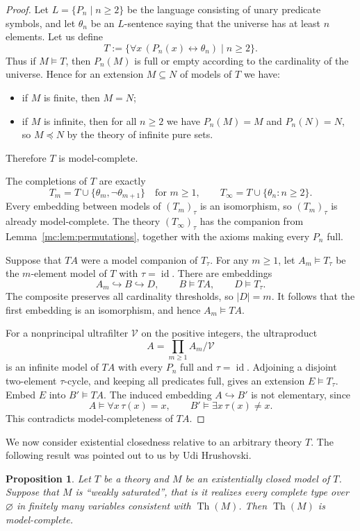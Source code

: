\documentclass[10pt,a4paper]{amsart}
\renewcommand{\geq}{\geqslant}
\newtheorem{proposition}[theorem]{Proposition}
\theoremstyle{definition}
\DeclareMathOperator{\Th}{Th}
\DeclareMathOperator{\id}{id}
\begin{document}
\begin{proof} 
Let $L=\{P_n\mid n\geq 2\}$ be the language consisting of unary predicate symbols, and let
$\theta_n$ be an $L$-sentence saying that the universe has at least $n$ elements.
Let us define
\[
  T:=\{\forall x\,(P_n(x)\leftrightarrow\theta_n)\mid n\geq 2\}.
\]
Thus if $M\models T$, then $P_n(M)$ is full or empty according to the cardinality of the
universe. Hence for an extension $M\subseteq N$ of models of $T$ we have:
\begin{itemize}
  \item if $M$ is finite, then $M=N$;
  \item if $M$ is infinite, then for all $n\geq 2$ we have $P_n(M)=M$ and $P_n(N)=N$, so $M\preccurlyeq N$ by the theory of infinite pure sets.
\end{itemize}
Therefore $T$ is model-complete.

The completions of $T$ are exactly
\[
  T_m=T\cup\{\theta_m,\neg\theta_{m+1}\}\quad 
       \text{for $m\geq 1$},\qquad
  T_\infty=T\cup\{\theta_n:n\geq 2\}.
\]
Every embedding between models of $(T_m)_\tau$ is an isomorphism,
so $(T_m)_\tau$ is already model-complete. The theory
$(T_\infty)_\tau$ has the companion from
Lemma~\ref{mc:lem:permutations}, together with the axioms making
every $P_n$ full.

Suppose that $TA$ were a model companion of $T_\tau$. For any $m\geq 1$, let $A_m\models T_\tau$ be
the $m$-element model of $T$ with $\tau=\id$. There are embeddings
\[
  A_m\hookrightarrow B\hookrightarrow D,
  \qquad B\models TA,\qquad D\models T_\tau.
\]
The composite preserves all cardinality thresholds, so $|D|=m$.
It follows that the first embedding is an isomorphism, and hence
$A_m\models TA$.

For a nonprincipal ultrafilter $\mathcal V$ on the positive integers,
the ultraproduct
\[
  A=\prod_{m\geq 1}A_m/\mathcal V
\]
is an infinite model of $TA$ with every $P_n$ full and $\tau=\id$.
Adjoining a disjoint two-element $\tau$-cycle, and keeping all
predicates full, gives an extension $E\models T_\tau$. Embed $E$
into $B'\models TA$. The induced embedding $A\hookrightarrow B'$
is not elementary, since
\[
  A\models\forall x\,\tau(x)=x,
  \qquad B'\models\exists x\,\tau(x)\neq x.
\]
This contradicts model-completeness of $TA$.
\end{proof}

We now consider existential closedness relative to an arbitrary
theory $T$. The following result was pointed out to us by Udi Hrushovski.
\begin{proposition}\label{mc:prop:saturated-ec}
Let $T$ be a theory and $M$
be an existentially closed model of $T$. Suppose that $M$ is ``weakly saturated'', that is it
realizes every complete type over $\varnothing$ in finitely many
variables consistent with $\Th(M)$. Then $\Th(M)$
is model-complete.
\end{proposition}
\end{document}
